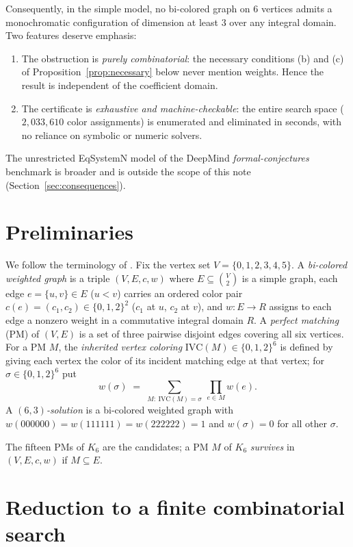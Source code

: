 \documentclass[11pt]{article}
\theoremstyle{definition}
\begin{document}
Consequently, in the simple model, no bi-colored graph on $6$ vertices
admits a monochromatic configuration of dimension at least $3$ over any
integral domain. Two features deserve emphasis:

\begin{enumerate}[label=(\alph*)]
\item The obstruction is \emph{purely combinatorial}: the necessary
conditions (b) and (c) of Proposition~\ref{prop:necessary} below never
mention weights. Hence the result is independent of the coefficient
domain.
\item The certificate is \emph{exhaustive and machine-checkable}: the
entire search space ($2{,}033{,}610$ color assignments) is enumerated
and eliminated in seconds, with no reliance on symbolic or numeric
solvers.
\end{enumerate}

The unrestricted EqSystemN model of the DeepMind
\emph{formal-conjectures} benchmark is broader and is outside the scope
of this note (Section~\ref{sec:consequences}).

\section{Preliminaries}\label{sec:prelim}

We follow the terminology of \cite{KGS19, CGI24}. Fix the vertex set
$V=\{0,1,2,3,4,5\}$. A \emph{bi-colored weighted graph} is a triple
$(V,E,c,w)$ where $E\subseteq\binom{V}{2}$ is a simple graph, each edge
$e=\{u,v\}\in E$ ($u<v$) carries an ordered color pair
$c(e)=(c_1,c_2)\in\{0,1,2\}^2$ ($c_1$ at $u$, $c_2$ at $v$), and
$w:E\to R$ assigns to each edge a nonzero weight in a commutative
integral domain $R$. A \emph{perfect matching} (PM) of $(V,E)$ is a set
of three pairwise disjoint edges covering all six vertices. For a PM
$M$, the \emph{inherited vertex coloring} $\mathrm{IVC}(M)\in
\{0,1,2\}^6$ is defined by giving each vertex the color of its incident
matching edge at that vertex; for $\sigma\in\{0,1,2\}^6$ put
\[
w(\sigma)\;=\;\sum_{M:\ \mathrm{IVC}(M)=\sigma}\ \prod_{e\in M} w(e).
\]
A \emph{$(6,3)$-solution} is a bi-colored weighted graph with
$w(000000)=w(111111)=w(222222)=1$ and $w(\sigma)=0$ for all other
$\sigma$.

The fifteen PMs of $K_6$ are the candidates; a PM $M$ of $K_6$
\emph{survives} in $(V,E,c,w)$ if $M\subseteq E$.

\section{Reduction to a finite combinatorial search}\label{sec:reduce}
\end{document}
